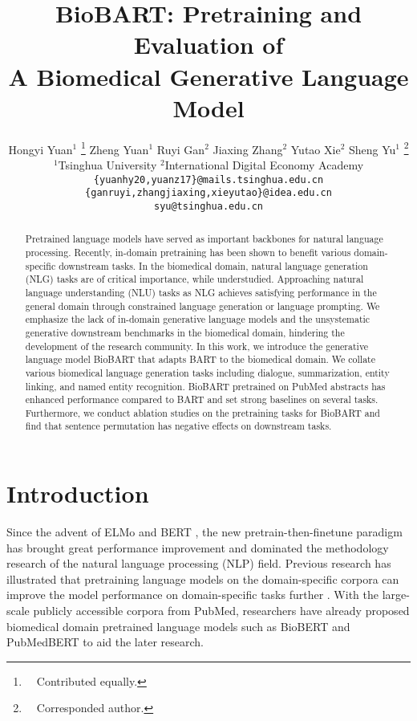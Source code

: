 \documentclass[11pt]{article}
\title{BioBART: Pretraining and Evaluation of \\ A Biomedical Generative Language Model}
\author{
Hongyi Yuan$^{1}$ \thanks{$\quad$Contributed equally.} \space\space
Zheng Yuan$^{1}$ \samethanks \space\space\space
Ruyi Gan$^{2}$ \space\space
Jiaxing Zhang$^{2}$ \space\space
Yutao Xie$^{2}$ \space\space
Sheng Yu$^{1}$ \thanks{$\quad$Corresponded author.} \\
$^{1}$Tsinghua University \space\space\space\space
$^{2}$International Digital Economy Academy\\
\texttt{\{yuanhy20,yuanz17\}@mails.tsinghua.edu.cn}\\
\texttt{\{ganruyi,zhangjiaxing,xieyutao\}@idea.edu.cn}\\
\texttt{syu@tsinghua.edu.cn}
}
\date{}
\begin{document}
\maketitle
\begin{abstract}
Pretrained language models have served as important backbones for natural language processing. Recently, in-domain pretraining has been shown to benefit various domain-specific downstream tasks. In the biomedical domain, natural language generation (NLG) tasks are of critical importance, while understudied. 
Approaching natural language understanding (NLU) tasks as NLG achieves satisfying performance in the general domain through constrained language generation or language prompting.
We emphasize the lack of in-domain generative language models and the unsystematic generative downstream benchmarks in the biomedical domain, hindering the development of the research community. 
In this work, we introduce the generative language model BioBART that adapts BART to the biomedical domain. 
We collate various biomedical language generation tasks including dialogue, summarization, entity linking, and named entity recognition.
BioBART pretrained on PubMed abstracts has enhanced performance compared to BART and set strong baselines on several tasks.
Furthermore, we conduct ablation studies on the pretraining tasks for BioBART and find that sentence permutation has negative effects on downstream tasks.
\end{abstract}

\section{Introduction}

Since the advent of ELMo \cite{elmo} and BERT \cite{Devlin2019BERTPO}, the new pretrain-then-finetune paradigm has brought great performance improvement and dominated the methodology research of the natural language processing (NLP) field. 
Previous research has illustrated that pretraining language models on the domain-specific corpora can improve the model performance on domain-specific tasks further \cite{Gururangan2020DontSP}. With the large-scale publicly accessible corpora from PubMed, researchers have already proposed biomedical domain pretrained language models such as BioBERT \cite{Lee2020BioBERTAP} and PubMedBERT \cite{pubmedbert} to aid the later research. 
\end{document}
